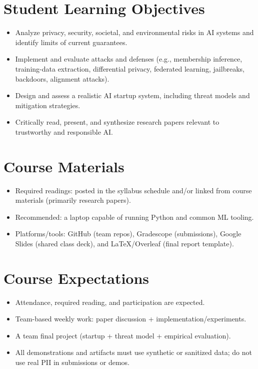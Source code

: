 \documentclass[11pt]{article}
\begin{document}
\section*{Student Learning Objectives}
\begin{itemize}
  \item Analyze privacy, security, societal, and environmental risks in AI systems and identify limits of current guarantees.
  \item Implement and evaluate attacks and defenses (e.g., membership inference, training-data extraction, differential privacy, federated learning, jailbreaks, backdoors, alignment attacks).
  \item Design and assess a realistic AI startup system, including threat models and mitigation strategies.
  \item Critically read, present, and synthesize research papers relevant to trustworthy and responsible AI.
\end{itemize}

\section*{Course Materials}
\begin{itemize}
  \item Required readings: posted in the syllabus schedule and/or linked from course materials (primarily research papers).
  \item Recommended: a laptop capable of running Python and common ML tooling.
  \item Platforms/tools: GitHub (team repos), Gradescope (submissions), Google Slides (shared class deck), and LaTeX/Overleaf (final report template).
\end{itemize}

\section*{Course Expectations}
\begin{itemize}
  \item Attendance, required reading, and participation are expected.
  \item Team-based weekly work: paper discussion + implementation/experiments.
  \item A team final project (startup + threat model + empirical evaluation).
  \item All demonstrations and artifacts must use synthetic or sanitized data; do not use real PII in submissions or demos.
\end{itemize}
\end{document}
